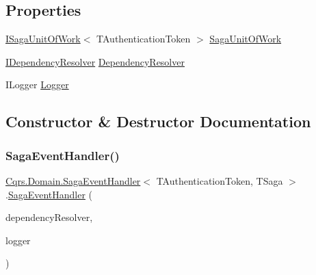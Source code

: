 \subsection*{Properties}
\begin{DoxyCompactItemize}
\item 
\hyperlink{interfaceCqrs_1_1Domain_1_1ISagaUnitOfWork}{I\+Saga\+Unit\+Of\+Work}$<$ T\+Authentication\+Token $>$ \hyperlink{classCqrs_1_1Domain_1_1SagaEventHandler_a4cab45aafb7b71534aae7cbe077d1129_a4cab45aafb7b71534aae7cbe077d1129}{Saga\+Unit\+Of\+Work}
\item 
\hyperlink{interfaceCqrs_1_1Configuration_1_1IDependencyResolver}{I\+Dependency\+Resolver} \hyperlink{classCqrs_1_1Domain_1_1SagaEventHandler_ad7497b0e19703aa351e571427a072d0d_ad7497b0e19703aa351e571427a072d0d}{Dependency\+Resolver}
\item 
I\+Logger \hyperlink{classCqrs_1_1Domain_1_1SagaEventHandler_a06c2d4b3720bec78e9cea40cb0ed2ff3_a06c2d4b3720bec78e9cea40cb0ed2ff3}{Logger}
\end{DoxyCompactItemize}


\subsection{Constructor \& Destructor Documentation}
\mbox{\label{classCqrs_1_1Domain_1_1SagaEventHandler_a4ad68643dd845330a96c71039cf0897f_a4ad68643dd845330a96c71039cf0897f}} 
\subsubsection{\texorpdfstring{Saga\+Event\+Handler()}{SagaEventHandler()}\hspace{0.1cm}{\footnotesize\ttfamily [1/2]}}
{\footnotesize\ttfamily \hyperlink{classCqrs_1_1Domain_1_1SagaEventHandler}{Cqrs.\+Domain.\+Saga\+Event\+Handler}$<$ T\+Authentication\+Token, T\+Saga $>$.\hyperlink{classCqrs_1_1Domain_1_1SagaEventHandler}{Saga\+Event\+Handler} (\begin{DoxyParamCaption}\item[{\hyperlink{interfaceCqrs_1_1Configuration_1_1IDependencyResolver}{I\+Dependency\+Resolver}}]{dependency\+Resolver,  }\item[{I\+Logger}]{logger }\end{DoxyParamCaption})\hspace{0.3cm}{\ttfamily [protected]}}



